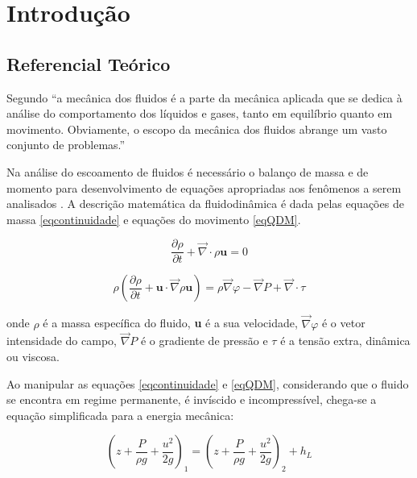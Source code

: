 \chapter{Introdução} \label{intro}

\section{Referencial Teórico}

Segundo  ``a mecânica dos fluidos é a parte da mecânica aplicada que se dedica à
análise do comportamento dos líquidos e gases, tanto em equilíbrio quanto em movimento.
Obviamente, o escopo da mecânica dos fluidos abrange um vasto conjunto de problemas.''

Na análise do escoamento de fluidos é necessário o balanço de massa e de momento 
para desenvolvimento de equações apropriadas aos fenômenos a serem analisados .
A descrição matemática da fluidodinâmica é dada pelas  equações de massa \eqref{eqcontinuidade}
e equações do movimento \eqref{eqQDM}.

\begin{equation}\label{eqcontinuidade}
    \frac{\partial\rho}{\partial t} + 
    \vec{\nabla} \cdot \rho \textbf{u}  = 0
\end{equation}

\begin{equation}\label{eqQDM}
    \rho \left(
        \frac{\partial \rho}{\partial t} + 
    \textbf{u} \cdot \vec{\nabla}\rho\textbf{u}
    \right)
    = 
    \rho\vec{\nabla}\varphi -
    \vec{\nabla} P +
    \vec{\nabla}\cdot \tau
\end{equation}

onde $\rho$ é a massa específica do fluido, \textbf{u} é a sua velocidade, $\vec{\nabla}\varphi$
é o vetor intensidade do campo, $\vec{\nabla} P$ é o gradiente de pressão e $\tau$ é a tensão extra,
dinâmica ou viscosa.

Ao manipular as equações \eqref{eqcontinuidade} e \eqref{eqQDM}, considerando que o fluido se
encontra em regime permanente, é invíscido e incompressível, chega-se a equação simplificada
para a energia mecânica:

\begin{equation}\label{eqBern}
    \left(
        z + \frac{P}{\rho g} + \frac{u^2}{2g}
    \right)_{1}
    =
    \left(
        z + \frac{P}{\rho g} + \frac{u^2}{2g}
    \right)_{2} + h_L
\end{equation}

